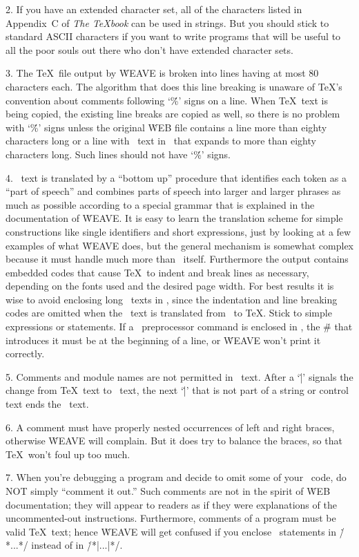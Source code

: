2. If you have an extended character set, all of the characters listed
in Appendix~C of {\sl The \TeX book\/} can be used in strings. But you should
stick to standard ASCII characters if you want to write programs that will
be useful to all the poor souls out there who don't have extended
character sets.

3. The \TeX\ file output by \.{WEAVE} is broken into lines having at most
80 characters each. The algorithm that does this line breaking is unaware
of \TeX's convention about comments following `\.\%' signs on a line. When
\TeX\ text is being copied, the existing line breaks are copied as well,
so there is no problem with `\.\%' signs unless the original \.{WEB} file
contains a line more than eighty characters long or a line with \Cee\
text in \pb\ that expands to more than eighty characters long. Such lines
should not have `\.\%' signs.

4. \Cee\ text is translated by a ``bottom up'' procedure that
identifies each token as a ``part of speech'' and combines parts of speech
into larger and larger phrases as much as possible according to a special
grammar that is explained in the documentation of \.{WEAVE}. It is easy to
learn the translation scheme for simple constructions like single
identifiers and short expressions, just by looking at a few examples of
what \.{WEAVE} does, but the general mechanism is somewhat complex because
it must handle much more than \Cee\ itself. Furthermore the output
contains embedded codes that cause \TeX\ to indent and break lines as
necessary, depending on the fonts used and the desired page width. For
best results it is wise to avoid enclosing long \Cee\ texts in \pb, since the
indentation and line breaking codes are omitted when the \pb\ text is
translated from \Cee\ to \TeX. Stick to simple expressions or
statements.  If a \Cee\ preprocessor command is enclosed in \pb,
the \.\# that introduces it must be at the beginning of a line,
or \.{WEAVE} won't print it correctly.

5. Comments and module names are not permitted in \pb\ text. After a `\.|'
signals the change from \TeX\ text to \Cee\ text, the next `\.|' that is
not part of a string or control text ends the \Cee\ text.

6. A comment must have properly nested occurrences of left and right
braces, otherwise \.{WEAVE} will complain. But it
does try to balance the braces, so that \TeX\ won't foul up too much.

7. When you're debugging a program and decide to omit some of your
\Cee\ code, do NOT simply ``comment it out.'' Such comments are not
in the spirit of \.{WEB} documentation; they will appear to readers
as if they were explanations of the uncommented-out instructions.
Furthermore, comments of a program must be valid \TeX\ text; hence
\.{WEAVE} will get confused if you enclose \Cee\ statements in
\.{/*...*/} instead of in \.{/*|...|*/}.

